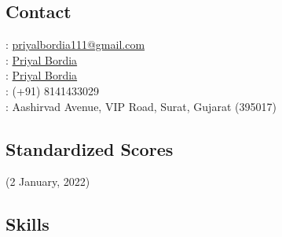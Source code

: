 \documentclass{My_CV}
\begin{document}
\justifying



\setlength{\columnsep}{1cm}
\setlength{\columnseprule}{1.25mm}



\begin{paracol}{2}



\begin{leftcolumn}



\vfill\null
\subsection{{\faTags} Contact}

\textcolor{Tan4}{\faEnvelope} : \href{mailto: priyalbordia111@gmail.com}{priyalbordia111@gmail.com} \\
\textcolor{SteelBlue1}{\faLinkedinSquare} : \href{https://www.linkedin.com/in/priyal-bordia-50026014a/}{Priyal Bordia} \\
{\faGithub} : \href{https://github.com/priyalbordia}{Priyal Bordia} \\
\textcolor{Purple3}{\faMobile} : (+91) 8141433029 \\
\textcolor{Coral2}{\faHome} : Aashirvad Avenue, VIP Road, Surat, Gujarat (395017)



\vfill\null
\subsection{{\faBookmark} Standardized Scores}

 \hfill{(2 January, 2022)} \\




\newpage
\subsection{{\faCubes} Skills}


\end{leftcolumn}
\end{paracol}
\end{document}
